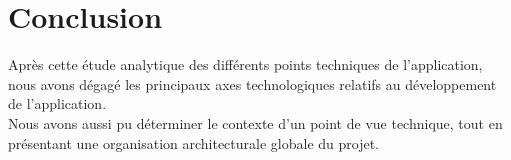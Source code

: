 \section*{Conclusion}

Après cette étude analytique des différents points techniques de l’application,
nous avons dégagé les principaux axes technologiques relatifs au
développement de l’application.\\  Nous avons aussi pu déterminer
le contexte d’un point de vue technique, tout en présentant une organisation
architecturale globale du projet.